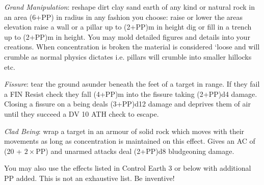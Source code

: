 \begin{multicols}{3}
{\begin{spellitemize}
\item {\it Grand Manipulation}: reshape dirt\comma{} clay\comma{} sand\comma{} earth of any kind\comma{} or natural rock in an area (6+PP) in radius in any fashion you choose: raise or lower the area\apos{}s elevation\comma{} raise a wall or a pillar up to (2+PP)m in height\comma{} dig or fill in a trench up to (2+PP)m in height. You may mold detailed figures and details into your creations. When concentration is broken\comma{} the material is considered `loose\apos{}\comma{} and will crumble as normal physics dictates\comma{} i.e. pillars will crumble into smaller hillocks etc. 
\item {\it Fissure}: tear the ground asunder beneath the feet of a target in range. If they fail a FIN Resist check\comma{} they fall (4+PP)m into the fissure\comma{} taking (2+PP)d4 damage. Closing a fissure on a being deals (3+PP)d12 damage and deprives them of air until they succeed a DV 10 ATH check to escape.
\item {\it Clad Being}: wrap a target in an armour of solid rock\comma{} which moves with their movements as long as concentration is maintained on this effect. Gives an AC of (20 + $2\times$PP)\comma{} and unarmed attacks deal (2+PP)d8 bludgeoning damage. 
\end{spellitemize}
You may also use the effects listed in Control Earth 3 or below with \PPDifference{\DVExp}{\DVAdp} additional PP added. 
This is not an exhaustive list. Be inventive!}
\end{multicols}
